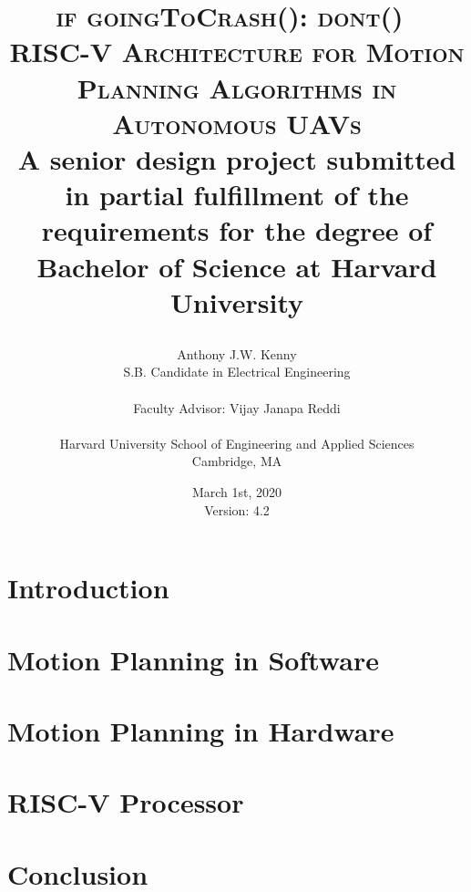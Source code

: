 \documentclass[
    11pt,           %
    letterpaper,    %
    oneside         %
]{report}           %
\title{\textsc{if goingToCrash(): dont()\ \\ RISC-V Architecture for Motion Planning Algorithms in Autonomous UAVs} \\ 
    \bigskip
    \small{A senior design project submitted in partial fulfillment of the requirements for the degree of Bachelor of Science at Harvard University} \\
\author{Anthony J.W. Kenny \\
        \small{S.B. Candidate in Electrical Engineering} \\ \\
        Faculty Advisor: Vijay Janapa Reddi \\ \\
        Harvard University School of Engineering and Applied Sciences \\
        \small{Cambridge, MA}}
\date{March 1st, 2020 \\ 
    \small{Version: 4.2}}}
\begin{document}
\maketitle
{}


    
    \clearpage

    \tableofcontents
    \clearpage

    \printglossary[type=\acronymtype,title={List of Acronyms},nopostdot]

    \listofalgorithms

    \listoffigures

    \listoftables


\chapter{Introduction}
    


\chapter{Motion Planning in Software}
    \label{chap:MotionPlanningInSoftware}
    

\chapter{Motion Planning in Hardware}
    \label{chap:MotionPlanningInHardware}
    

\chapter{RISC-V Processor}
    \label{chap:RiscvProcessor}
    

\chapter{Conclusion}
\end{document}

